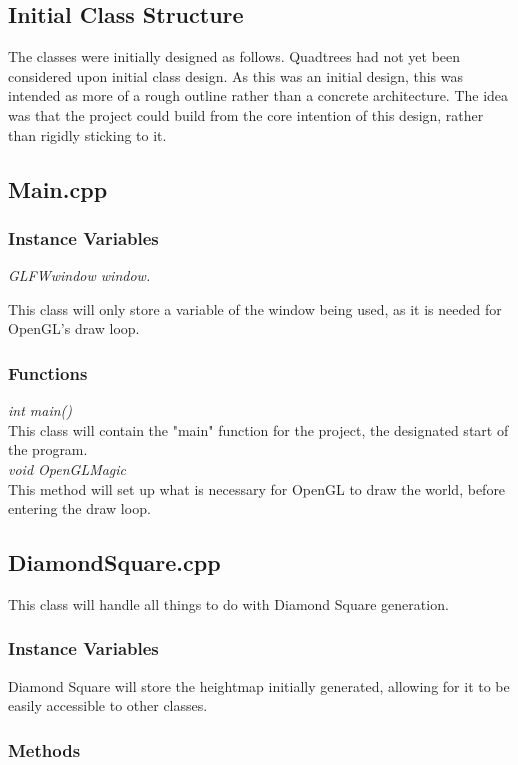 \documentclass[a4paper,10pt]{report}
\begin{document}
\subsection{Initial Class Structure}
The classes were initially designed as follows. Quadtrees had not yet been considered upon initial class design. As this was an initial design, this was intended as more of a rough outline rather than a concrete architecture. The idea was that the project could build from the core intention of this design, rather than rigidly sticking to it. 

\subsection{Main.cpp}

\subsubsection{Instance Variables}
\textit{GLFWwindow window.} 

This class will only store a variable of the window being used, as it is needed for OpenGL's draw loop.
\subsubsection{Functions}
\textit{int main()}\\
This class will contain the "main" function for the project, the designated start of the program. \\

\textit{void OpenGLMagic}\\
This method will set up what is necessary for OpenGL to draw the world, before entering the draw loop.


\subsection{DiamondSquare.cpp}

This class will handle all things to do with Diamond Square generation. 

\subsubsection{Instance Variables}

Diamond Square will store the heightmap initially generated, allowing for it to be easily accessible to other classes.

\subsubsection{Methods}
\end{document}
